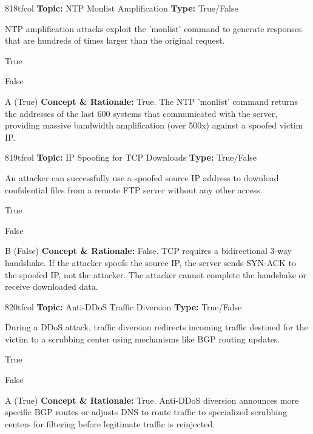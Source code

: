\begin{qcard}{818}{tfcol}
\textcolor{darkslate!75}{\small\textbf{Topic:} NTP Monlist Amplification \hfill \textbf{Type:} True/False}\vspace{0.4em}\par
NTP amplification attacks exploit the 'monlist' command to generate responses that are hundreds of times larger than the original request.
\begin{qoptions}
\item True
\item False
\end{qoptions}
\end{qcard}
\nopagebreak
\begin{explainbox}{A (True)}
\textbf{Concept \& Rationale:} True. The NTP 'monlist' command returns the addresses of the last 600 systems that communicated with the server, providing massive bandwidth amplification (over 500x) against a spoofed victim IP.
\end{explainbox}

\begin{qcard}{819}{tfcol}
\textcolor{darkslate!75}{\small\textbf{Topic:} IP Spoofing for TCP Downloads \hfill \textbf{Type:} True/False}\vspace{0.4em}\par
An attacker can successfully use a spoofed source IP address to download confidential files from a remote FTP server without any other access.
\begin{qoptions}
\item True
\item False
\end{qoptions}
\end{qcard}
\nopagebreak
\begin{explainbox}{B (False)}
\textbf{Concept \& Rationale:} False. TCP requires a bidirectional 3-way handshake. If the attacker spoofs the source IP, the server sends SYN-ACK to the spoofed IP, not the attacker. The attacker cannot complete the handshake or receive downloaded data.
\end{explainbox}

\begin{qcard}{820}{tfcol}
\textcolor{darkslate!75}{\small\textbf{Topic:} Anti-DDoS Traffic Diversion \hfill \textbf{Type:} True/False}\vspace{0.4em}\par
During a DDoS attack, traffic diversion redirects incoming traffic destined for the victim to a scrubbing center using mechanisms like BGP routing updates.
\begin{qoptions}
\item True
\item False
\end{qoptions}
\end{qcard}
\nopagebreak
\begin{explainbox}{A (True)}
\textbf{Concept \& Rationale:} True. Anti-DDoS diversion announces more specific BGP routes or adjusts DNS to route traffic to specialized scrubbing centers for filtering before legitimate traffic is reinjected.
\end{explainbox}

